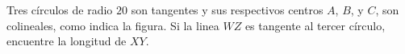 Tres círculos de radio $20$ son tangentes y sus respectivos centros $A$, $B$, y $C$, son colineales, como indica la figura. Si la linea $WZ$ es tangente al tercer círculo, encuentre la longitud de $XY$.